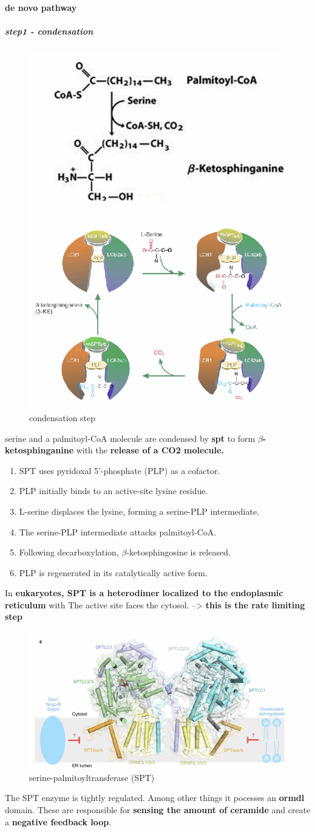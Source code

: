 \documentclass[../main.tex]{subfiles}
\begin{document}
\paragraph{de novo pathway}
\subparagraph{step1 - condensation}
\begin{figure}[h]
    \centering
    \includegraphics[width=0.5\linewidth]{step1S.png}
    \caption{condensation step}
    \label{fig:enter-label}
\end{figure}
serine and a palmitoyl-CoA 
molecule are condensed by \textbf{\gls{spt}} to form 
\textbf{$\beta$-ketosphinganine} with the \textbf{release of a CO2 molecule. }
\begin{enumerate}
    \item SPT uses pyridoxal 5'-phosphate (PLP) as a cofactor.
    \item PLP initially binds to an active-site lysine residue.
    \item L-serine displaces the lysine, forming a serine-PLP intermediate.
    \item The serine-PLP intermediate attacks palmitoyl-CoA.
    \item Following decarboxylation, $\beta$-ketosphingosine is released.
    \item PLP is regenerated in its catalytically active form.
\end{enumerate}
In \textbf{eukaryotes, SPT is a heterodimer} \textbf{localized to the endoplasmic reticulum} with The active site faces the cytosol.
--> \textbf{this is the rate limiting step }
\begin{figure}[H]
    \centering
    \includegraphics[width=0.5\linewidth]{structureSphingolipidSythase.png}
    \caption{serine-palmitoyltransferase (SPT)}
    \label{fig:enter-label}
\end{figure}
The SPT enzyme is tightly regulated. Among other things it pocesses an \textbf{\gls{ormdl}} domain. These are responsible for \textbf{sensing the amount of ceramide} and create a \textbf{negative feedback loop}.
\end{document}
